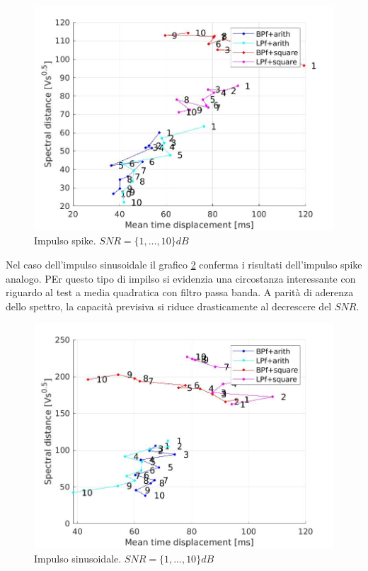 \documentclass[9pt,twocolumn,twoside]{osajnl}
\begin{document}
\begin{figure}[htbp]
\centering
\includegraphics[width=1\linewidth]{results/scatter4.jpg}
\caption{Impulso spike. $SNR= \{1, ..., 10\}dB$}
\label{fig:scatter4}
\end{figure}

Nel caso dell'impulso sinusoidale il grafico \ref{fig:scatter5} conferma i risultati dell'impulso spike analogo.
PEr questo tipo di impilso si evidenzia una circostanza interessante con riguardo al test a media quadratica con filtro passa banda. A parità di aderenza dello spettro, la capacità previsiva si riduce drasticamente al decrescere del $SNR$.

\begin{figure}[htbp]
\centering
\includegraphics[width=1\linewidth]{results/scatter5.jpg}
\caption{Impulso sinusoidale. $SNR= \{1, ..., 10\}dB$}
\label{fig:scatter5}
\end{figure}
\end{document}
